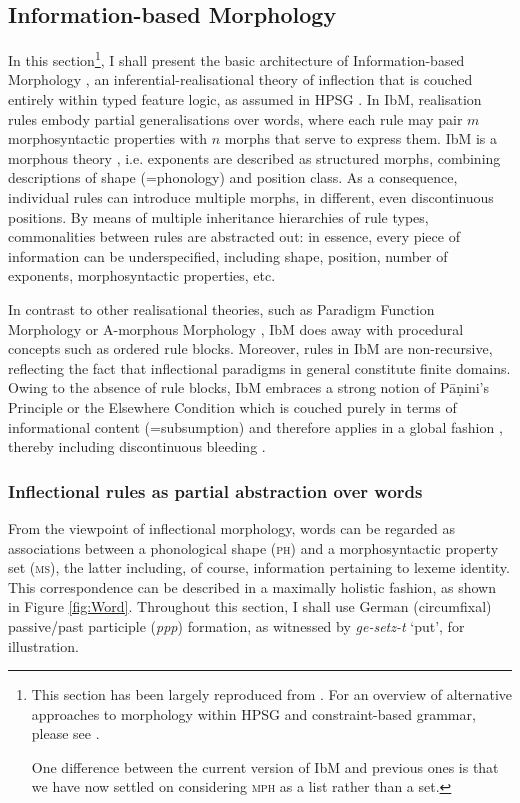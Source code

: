 \documentclass[output=paper]{langsci/langscibook}
\begin{document}
\subsection{Information-based Morphology}
\label{sec:IbM}

In this section\footnote{This section has been largely reproduced from
  \citet{Crysmann:Bonami:2017:HPSG}. For an overview of alternative
  approaches to morphology within HPSG and constraint-based grammar,
  please see \citet{Bonami15b}.

  One difference between the current version of IbM and previous ones
  is that we have now settled on considering \textsc{mph} as a list rather
  than a set.  }, I shall present the basic architecture of
Information-based Morphology
\citep[=IbM][]{Crysmann:Bonami:2016,Crysmann:14:OUP}, an
inferential-realisa\-tional theory of inflection \citep[cf.][]{Stump01}
that is couched entirely within typed feature logic, as assumed in
HPSG \citep{Pollard87,Pollard94}. In IbM, realisation rules embody
partial generalisations over words, where each rule may pair $m$
morphosyntactic properties with $n$ morphs that serve to express them.
IbM is a morphous theory \citep{Crysmann:Bonami:2016}, i.e. exponents
are described as structured morphs, combining descriptions of shape
(=phonology) and position class. As a consequence, individual rules
can introduce multiple morphs, in different, even discontinuous
positions. By means of multiple inheritance hierarchies of rule types,
commonalities between rules are abstracted out: in essence, every
piece of information can be underspecified, including shape, position,
number of exponents, morphosyntactic properties, etc.

In contrast to other realisational theories, such as Paradigm Function
Morphology \citep{Stump01} or A-morphous Morphology
\citep{Anderson92}, IbM does away with procedural concepts such as
ordered rule blocks. Moreover, rules in IbM are non-recursive,
reflecting the fact that inflectional paradigms in general constitute
finite domains.  Owing to the absence of rule blocks, IbM embraces a
strong notion of Pāṇini's Principle or the Elsewhere Condition
\citep{kiparsky_p85} which is couched purely in terms of informational
content (=subsumption) and therefore applies in a global fashion
\citep{Crysmann:14:OUP}, thereby including discontinuous bleeding
\citep{Noyer92}.

\subsubsection{Inflectional rules as partial abstraction over words}
From the viewpoint of inflectional morphology, words can be regarded
as associations between a phonological shape (\textsc{ph}) and a
morphosyntactic property set (\textsc{ms}), the latter including, of
course, information pertaining to lexeme identity. This correspondence
can be described in a maximally holistic fashion, as shown in Figure
\ref{fig:Word}. Throughout this section, I shall use German
(circumfixal) passive/past participle (\emph{ppp}) formation, as
witnessed by \textit{ge-setz-t} `put', for illustration.
\end{document}
